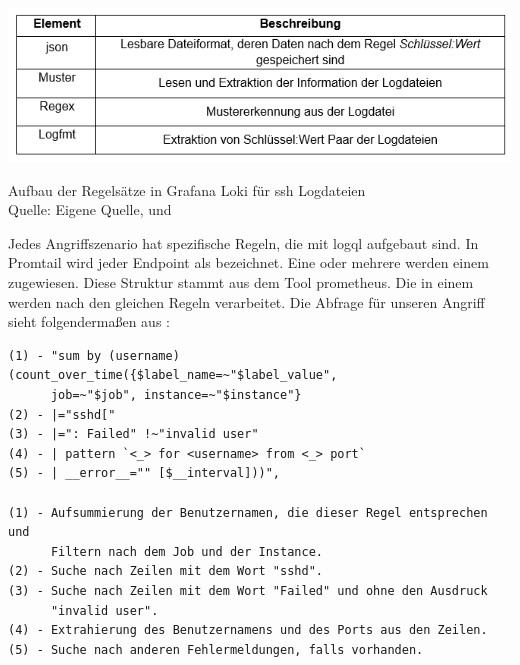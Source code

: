 \begin{table}[H]
   \includegraphics[width=\linewidth]{assets/tabelle_sshgrafana.png}
   \caption{Aufbau der Regelsätze in Grafana Loki für \gls{ssh} Logdateien \\Quelle: Eigene Quelle, \citep{VoidQuark_sshlogs} und \citep{Setter_Logfmt}}
\end{table}

Jedes Angriffszenario hat spezifische Regeln, die mit \gls{logql} aufgebaut sind. In Promtail wird jeder \gls{Endpoint} als  bezeichnet. Eine oder mehrere  werden einem  zugewiesen. Diese Struktur stammt aus dem Tool \gls{prometheus}. Die  in einem  werden nach den gleichen Regeln verarbeitet. Die Abfrage für unseren Angriff sieht folgendermaßen aus \citep{VoidQuark_sshlogs}:


{
\begin{Verbatim}[frame=single]
(1) - "sum by (username) (count_over_time({$label_name=~"$label_value",
      job=~"$job", instance=~"$instance"} 
(2) - |="sshd[" 
(3) - |=": Failed" !~"invalid user" 
(4) - | pattern `<_> for <username> from <_> port` 
(5) - | __error__="" [$__interval]))",

(1) - Aufsummierung der Benutzernamen, die dieser Regel entsprechen und
      Filtern nach dem Job und der Instance.
(2) - Suche nach Zeilen mit dem Wort "sshd".
(3) - Suche nach Zeilen mit dem Wort "Failed" und ohne den Ausdruck
      "invalid user".
(4) - Extrahierung des Benutzernamens und des Ports aus den Zeilen.
(5) - Suche nach anderen Fehlermeldungen, falls vorhanden.
\end{Verbatim}
}

